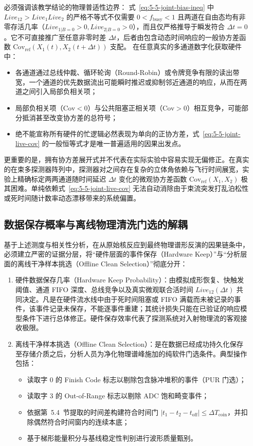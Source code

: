 必须强调该教学结论的物理普适性边界：
式~\eqref{eq:5-5-joint-bias-ineq} 中 $Live_{12} > Live_1 Live_2$ 的严格不等式不仅需要 $0 < f_{\mathrm{busy}} < 1$ 且两道在自由态均有非零存活几率（$Live_{1|B=0} > 0, Live_{2|B=0} > 0$），而且仅严格推导于瞬发符合 $\Delta t = 0$。它不可直接推广至任意非零时差 $\Delta t$，后者由包含动态时间响应的一般协方差函数 $\mathrm{Cov}_{\mathrm{ref}}(X_1(t), X_2(t+\Delta t))$ 支配。
在任意真实的多通道数字化获取硬件中：
\begin{itemize}
\item 各通道通过总线仲裁、循环轮询（Round-Robin）或令牌竞争有限的读出带宽，一个通道的优先数据流出可能瞬时推迟或抑制邻近通道的响应，从而在两道之间引入局部负相关项；
\item 局部负相关项（$\mathrm{Cov} < 0$）与公共阻塞正相关项（$\mathrm{Cov} > 0$）相互竞争，可能部分抵消甚至改变协方差的总符号；
\item 绝不能宣称所有硬件的忙逻辑必然表现为单向的正协方差，式~\eqref{eq:5-5-joint-live-cov} 的一般恒等式才是唯一普遍适用的因果出发点。
\end{itemize}

更重要的是，拥有协方差展开式并不代表在实际实验中容易实现无偏修正。在真实的在束多探测器阵列中，探测器对之间存在复杂的立体角依赖与飞行时间展宽，实验上精确标定两两通道随时间延迟 $\Delta t$ 变化的微观协方差函数 $\mathrm{Cov}_{\mathrm{ref}}(X_1, X_2)$ 极其困难。单纯依赖式~\eqref{eq:5-5-joint-live-cov} 无法自动消除由于束流突发打乱泊松性或死时间随计数率动态漂移带来的系统偏置。

\subsection{数据保存概率与离线物理清洗门选的解耦}\label{subsec:5-5-5}

基于上述测度与相关性分析，在从原始核反应到最终物理谱形反演的因果链条中，必须建立严密的证据分层，将“硬件层面的事件保存（Hardware Keep）”与“分析层面的离线干净样本挑选（Offline Clean Selection）”彻底分开：
\begin{enumerate}
\item 硬件数据保存几率（Hardware Keep Probability）：由模拟成形恢复、快触发阈值、通道 FIFO 深度、总线竞争以及真实微观联合活时间 $Live_{12}(\Delta t)$ 共同决定。凡是在硬件流水线中由于死时间阻塞或 FIFO 满载而未被记录的事件，该事件记录未保存，不能逐事件重建；其统计损失只能在已验证的响应模型条件下进行总体修正。硬件保存效率代表了探测系统对入射物理流的客观接收极限。
\item 离线干净样本挑选（Offline Clean Selection）：是在数据已经成功持久化保存至存储介质之后，分析人员为净化物理谱峰施加的纯软件门选条件。典型操作包括：
\begin{itemize}
\item 读取字 0 的 Finish Code 标志以剔除包含脉冲堆积的事件（PUR 门选）；
\item 读取字 3 的 Out-of-Range 标志以剔除 ADC 饱和畸变事件；
\item 依据第~5.4~节提取的时间差构建符合时间门 $|t_1 - t_2 - t_{\mathrm{off}}| \le \Delta T_{\mathrm{coin}}$，并扣除偶然符合时间窗内的连续本底；
\item 基于梯形能量积分与基线稳定性判别进行波形质量甄别。
\end{itemize}
\end{enumerate}

